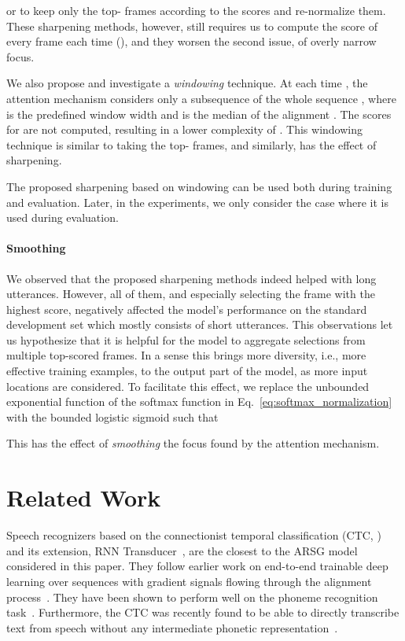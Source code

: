 \documentclass{article}
\begin{document}
or to keep only the top- frames according to the scores and re-normalize
them.  These sharpening methods, however, still requires us to compute the score
of every frame each time (), and they worsen the second issue, of overly narrow 
focus.

We also propose and investigate a {\it windowing} technique.
At each time , the attention mechanism considers only a subsequence
 of the whole sequence , where 
 is the predefined window width and  is the median of the alignment
. The scores for  are not computed, 
resulting in a lower complexity of .
This windowing technique is similar to taking the top- frames, and similarly,
has the effect of sharpening.


The proposed sharpening based on windowing can be used both during training and
evaluation. Later, in the experiments, we only consider the case where it is
used during evaluation.

\paragraph{Smoothing}

We observed that the proposed sharpening methods indeed
helped with long utterances. However, all of them, and
especially selecting the frame with the highest score,
negatively affected the model's performance on the standard
development set which mostly consists of short utterances.
This observations let us hypothesize that it is helpful for
the model to aggregate selections from multiple top-scored
frames. In a sense this brings more diversity, i.e., more
effective training examples, to the output part of the model,
as more input locations are considered.
To facilitate this effect, we replace the
unbounded exponential
function of the softmax function in
Eq.~\eqref{eq:softmax_normalization} with the
bounded logistic sigmoid  such that 

This has the effect of {\it smoothing} the focus found by the attention
mechanism.










\section{Related Work}

Speech recognizers based on the connectionist temporal classification (CTC,
\cite{graves_2006_connectionist}) and its extension, RNN
Transducer~\cite{graves_2012_sequence}, are the closest to the ARSG model
considered in this paper. They follow earlier work on end-to-end trainable deep
learning over sequences with gradient signals flowing through the alignment
process~\cite{LeCun98-small}. They have been shown to perform well on the
phoneme recognition task~\cite{graves_2013_timit}.  Furthermore, the CTC was
recently found to be able to directly transcribe text from speech without any
intermediate phonetic representation~\cite{graves_2014_towards}.
\end{document}
